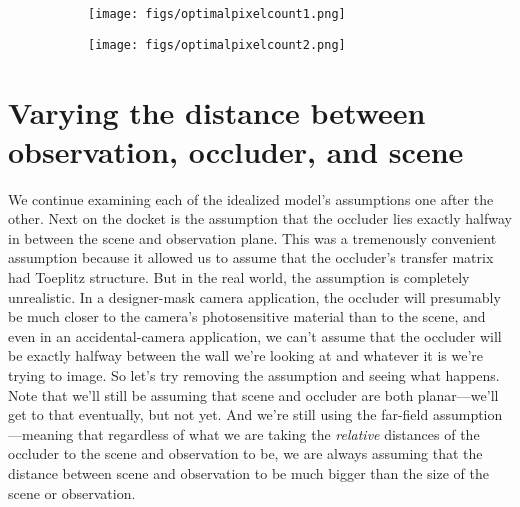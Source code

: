 \begin{figure}
\centering
\begin{subfigure}[b]{.7\linewidth}
\texttt{[image: figs/optimalpixelcount1.png]}
\end{subfigure}
\caption{Top: the approximate effective pixel count of scenes generated with a given level of correlation ($\beta$) and under a given signal-to-noise ratio (SNR). As expected, more correlated scenes and noisier scenes both have fewer effective pixels. Note, however, that even highly correlated scenes can have high effective pixel counts if the SNR is high enough, but if the SNR is low enough the scene will always have a low effective pixel count. Effective pixel count was estimated by choosing which of the nine spectrally-flat masks shown on bottom yielded the highest mutual information. Bottom: masks corresponding to each of the effective scene pixel counts. Note that these masks repeat themselves once in each dimension, so each mask is $2n - 1 \times 2n - 1$ if the effective pixel count is $n$. This is due to the phenomenon described in Figure~\ref{fig:fig:paleysetup}.}
\begin{subfigure}[b]{.7\linewidth}
\texttt{[image: figs/optimalpixelcount2.png]}
\end{subfigure}
\label{fig:optimalpixelcount}
\end{figure}

\section{Varying the distance between observation, occluder, and scene}

We continue examining each of the idealized model's assumptions one after the other. Next on the docket is the assumption that the occluder lies exactly halfway in between the scene and observation plane. This was a tremenously convenient assumption because it allowed us to assume that the occluder's transfer matrix had Toeplitz structure. But in the real world, the assumption is completely unrealistic. In a designer-mask camera application, the occluder will presumably be much closer to the camera's photosensitive material than to the scene, and even in an accidental-camera application, we can't assume that the occluder will be exactly halfway between the wall we're looking at and whatever it is we're trying to image. So let's try removing the assumption and seeing what happens. Note that we'll still be assuming that scene and occluder are both planar---we'll get to that eventually, but not yet. And we're still using the far-field assumption---meaning that regardless of what we are taking the \emph{relative} distances of the occluder to the scene and observation to be, we are always assuming that the distance between scene and observation to be much bigger than the size of the scene or observation.

